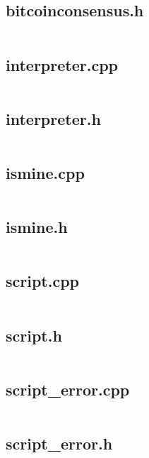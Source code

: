 \documentclass{article}
\begin{document}
\subsection{bitcoinconsensus.h}
\inputminted{cpp}{/home/dufferzafar/dev/@clones/bitcoin/src/script/bitcoinconsensus.h}
\newpage

\subsection{interpreter.cpp}
\inputminted{cpp}{/home/dufferzafar/dev/@clones/bitcoin/src/script/interpreter.cpp}
\newpage

\subsection{interpreter.h}
\inputminted{cpp}{/home/dufferzafar/dev/@clones/bitcoin/src/script/interpreter.h}
\newpage

\subsection{ismine.cpp}
\inputminted{cpp}{/home/dufferzafar/dev/@clones/bitcoin/src/script/ismine.cpp}
\newpage

\subsection{ismine.h}
\inputminted{cpp}{/home/dufferzafar/dev/@clones/bitcoin/src/script/ismine.h}
\newpage

\subsection{script.cpp}
\inputminted{cpp}{/home/dufferzafar/dev/@clones/bitcoin/src/script/script.cpp}
\newpage

\subsection{script.h}
\inputminted{cpp}{/home/dufferzafar/dev/@clones/bitcoin/src/script/script.h}
\newpage

\subsection{script\_error.cpp}
\inputminted{cpp}{/home/dufferzafar/dev/@clones/bitcoin/src/script/script_error.cpp}
\newpage

\subsection{script\_error.h}
\inputminted{cpp}{/home/dufferzafar/dev/@clones/bitcoin/src/script/script_error.h}
\newpage
\end{document}
